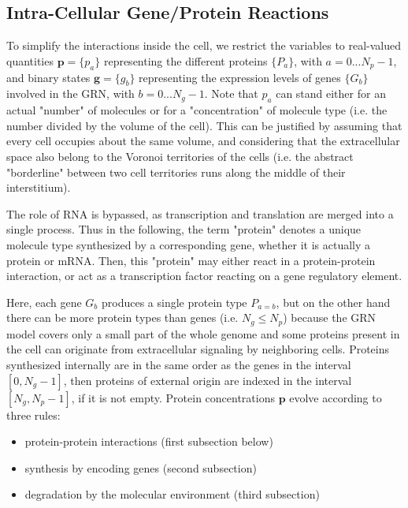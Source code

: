 \subsection{Intra-Cellular Gene/Protein Reactions}


To simplify the interactions inside the cell, we restrict the variables to real-valued quantities $\mathbf{p}=\{p_a\}$ representing the different proteins $\{P_a\}$, with $a=0...N_p\!-\!1$, and binary states $\mathbf{g}=\{g_b\}$ representing the expression levels of genes $\{G_b\}$ involved in the GRN, with $b=0...N_g\!-\!1$. Note that $p_a$ can stand either for an actual "number" of molecules or for a "concentration" of molecule type (i.e. the number divided by the volume of the cell). This can be justified by assuming that every cell occupies about the same volume, and considering that the extracellular space also belong to the Voronoi territories of the cells (i.e. the abstract "borderline" between two cell territories runs along the middle of their interstitium).

The role of RNA is bypassed, as transcription and translation are merged into a single process. Thus in the following, the term "protein" denotes a unique molecule type synthesized by a corresponding gene, whether it is actually a protein or mRNA. Then, this "protein" may either react in a protein-protein interaction, or act as a transcription factor reacting on a gene regulatory element.

Here, each gene $G_b$ produces a single protein type $P_{a=b}$, but on the other hand there can be more protein types than genes (i.e. $N_g \leq N_p$) because the GRN model covers only a small part of the whole genome and some proteins present in the cell can originate from extracellular signaling by neighboring cells. Proteins synthesized internally are in the same order as the genes in the interval $[0, N_g\!-\!1]$, then proteins of external origin are indexed in the interval $[N_g,N_p\!-\!1]$, if it is not empty. Protein concentrations $\mathbf{p}$ evolve according to three rules:
\begin{itemize}
	\item protein-protein interactions (first subsection below)
	\item synthesis by encoding genes (second subsection)
	\item degradation by the molecular environment (third subsection)
\end{itemize}


